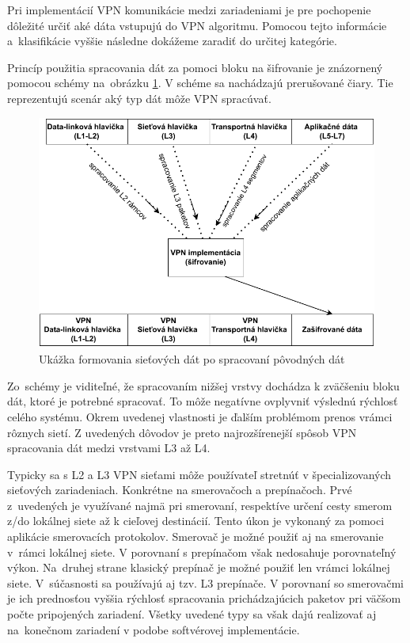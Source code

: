 Pri implementácií VPN komunikácie medzi zariadeniami je pre pochopenie dôležité určiť aké dáta vstupujú do VPN algoritmu. Pomocou tejto informácie a~klasifikácie vyššie následne dokážeme zaradiť do určitej kategórie. 

Princíp použitia spracovania dát za pomoci bloku na šifrovanie je znázornený pomocou schémy na~obrázku \ref{sifr}. V schéme sa nachádzajú prerušované čiary. Tie reprezentujú scenár aký typ dát môže VPN spracúvať.

\begin{figure}[!h]
	\centering
	\includegraphics[width=1\textwidth]{figures/sifr}
	\caption{Ukážka formovania sieťových dát po spracovaní pôvodných dát}
	\label{sifr}
\end{figure}

Zo~schémy je viditeľné, že spracovaním nižšej vrstvy dochádza k zväčšeniu bloku dát, ktoré je potrebné spracovať. To môže negatívne ovplyvniť výslednú rýchlosť celého systému. Okrem uvedenej vlastnosti je ďalším problémom prenos vrámci rôznych sietí. Z uvedených dôvodov je preto najrozšírenejší spôsob VPN spracovania dát medzi vrstvami L3 až L4. 

Typicky sa s L2 a L3 VPN sieťami môže používateľ stretnúť v špecializovaných sieťových zariadeniach. Konkrétne na smerovačoch a prepínačoch. Prvé z~uvedených je využívané najmä pri smerovaní, respektíve určení cesty smerom z/do lokálnej siete až k cieľovej destinácií. Tento úkon je vykonaný za pomoci aplikácie smerovacích protokolov. Smerovač je možné použiť aj na smerovanie v~rámci lokálnej siete. V porovnaní s prepínačom však nedosahuje porovnateľný výkon. Na~druhej strane klasický prepínač je možné použiť len vrámci lokálnej siete. V~súčasnosti sa používajú aj tzv. L3 prepínače. V porovnaní so smerovačmi je ich prednosťou vyššia rýchlosť spracovania prichádzajúcich paketov pri väčšom počte pripojených zariadení. Všetky uvedené typy sa však dajú realizovať aj na~konečnom zariadení v podobe softvérovej implementácie.        

